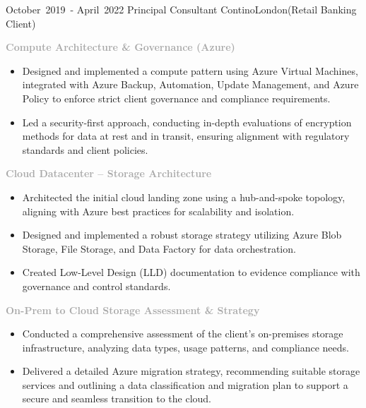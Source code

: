 \cventry %
  {\mbox{October 2019 -} \mbox{April 2022}}
  {Principal Consultant}
  {Contino}{London}{(Retail Banking Client)}
  { 
    \textcolor{darkgray}{\textbf{Compute Architecture \& Governance (Azure)}}
    \begin{itemize}
     \item Designed and implemented a compute pattern using Azure Virtual Machines, integrated with Azure Backup, Automation, Update Management, and Azure Policy to enforce strict client governance and compliance requirements.
     \item Led a security-first approach, conducting in-depth evaluations of encryption methods for data at rest and in transit, ensuring alignment with regulatory standards and client policies.
    \end{itemize}
    \textcolor{darkgray}{\textbf{Cloud Datacenter – Storage Architecture}}
    \begin{itemize}
     \item Architected the initial cloud landing zone using a hub-and-spoke topology, aligning with Azure best practices for scalability and isolation.
     \item Designed and implemented a robust storage strategy utilizing Azure Blob Storage, File Storage, and Data Factory for data orchestration.
     \item Created Low-Level Design (LLD) documentation to evidence compliance with governance and control standards.
    \end{itemize}
    \textcolor{darkgray}{\textbf{On-Prem to Cloud Storage Assessment \& Strategy}}
    \begin{itemize}
     \item Conducted a comprehensive assessment of the client’s on-premises storage infrastructure, analyzing data types, usage patterns, and compliance needs.
     \item Delivered a detailed Azure migration strategy, recommending suitable storage services and outlining a data classification and migration plan to support a secure and seamless transition to the cloud.
    \end{itemize}
    \bigskip
  }

